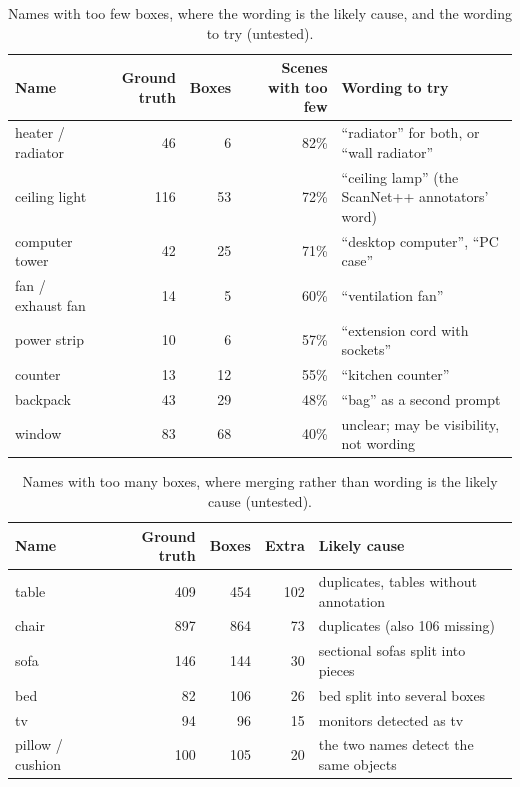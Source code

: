\begin{table}[t]
\centering
\caption{Names with too few boxes, where the wording is the likely cause, and the wording to try (untested).}
\label{tab:sam3-q5-few}
\begin{tabular}{lrrrl}
\toprule
Name & Ground truth & Boxes & Scenes with too few & Wording to try \\
\midrule
heater / radiator & 46  & 6  & 82\% & ``radiator'' for both, or ``wall radiator'' \\
ceiling light     & 116 & 53 & 72\% & ``ceiling lamp'' (the ScanNet++ annotators' word) \\
computer tower    & 42  & 25 & 71\% & ``desktop computer'', ``PC case'' \\
fan / exhaust fan & 14  & 5  & 60\% & ``ventilation fan'' \\
power strip       & 10  & 6  & 57\% & ``extension cord with sockets'' \\
counter           & 13  & 12 & 55\% & ``kitchen counter'' \\
backpack          & 43  & 29 & 48\% & ``bag'' as a second prompt \\
window            & 83  & 68 & 40\% & unclear; may be visibility, not wording \\
\bottomrule
\end{tabular}
\end{table}

\begin{table}[t]
\centering
\caption{Names with too many boxes, where merging rather than wording is the likely cause (untested).}
\label{tab:sam3-q5-many}
\begin{tabular}{lrrrl}
\toprule
Name & Ground truth & Boxes & Extra & Likely cause \\
\midrule
table            & 409 & 454 & 102 & duplicates, tables without annotation \\
chair            & 897 & 864 & 73  & duplicates (also 106 missing) \\
sofa             & 146 & 144 & 30  & sectional sofas split into pieces \\
bed              & 82  & 106 & 26  & bed split into several boxes \\
tv               & 94  & 96  & 15  & monitors detected as tv \\
pillow / cushion & 100 & 105 & 20  & the two names detect the same objects \\
\bottomrule
\end{tabular}
\end{table}

